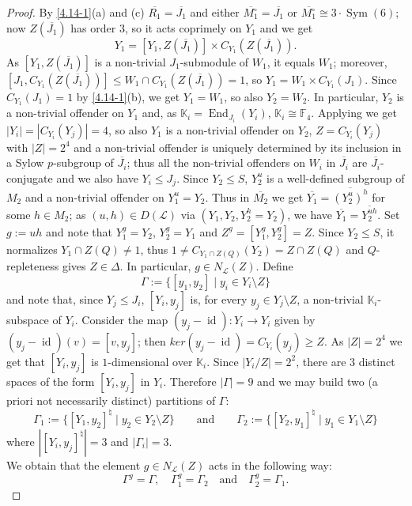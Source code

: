 \documentclass{amsart}
\numberwithin{equation}{section}
\theoremstyle{definition}
\theoremstyle{subresult}
\theoremstyle{caseresult}
\newcommand{\bF}{\mathbb{F}}
\newcommand{\bK}{\mathbb{K}}
\renewcommand{\L}{\mathcal{L}}
\newcommand{\End}{\operatorname{End}}
\newcommand{\id}{\operatorname{id}}
\newcommand{\Sym}{\operatorname{Sym}}
\newcommand{\ov}{\overline}
\newcommand{\fto}{\longrightarrow}
\newcommand{\<}{\langle}
\renewcommand{\>}{\rangle}
\begin{document}
\begin{proof}
	By \eqref{4.14-1}(a) and (c) $\ov{R_1} = \ov{J_1}$ and either $\ov{M_1^\circ} = \ov{J_1}$ or $\ov{M_1^\circ} \cong 3 \cdot \Sym(6)$; now $Z(\ov{J_1})$ has order $3$, so it acts coprimely on $Y_1$ and we get
	\[
	Y_1 = [Y_1,Z(\ov{J_1})] \times C_{Y_1}(Z(\ov{J_1})).
	\]
	As $[Y_1,Z(\ov{J_1})]$ is a non-trivial $J_1$-submodule of $W_1$, it equals $W_1$; moreover, $[J_1, C_{Y_1}(Z(\ov{J_1}))] \le W_1 \cap C_{Y_1}(Z(\ov{J_1})) =1$, so $Y_1 = W_1 \times C_{Y_1}(J_1)$. Since $C_{Y_1}(J_1) = 1$ by \eqref{4.14-1}(b), we get $Y_1 = W_1$, so also $Y_2 =W_2$. In particular, $Y_2$ is a non-trivial offender on $Y_1$ and, as $\bK_i=\End_{J_i}(Y_i)$, $\bK_i \cong \bF_4$. Applying \cite[Theorem C.4(e)]{Meier-Stell-Stroth:2012} we get $|Y_i|=|C_{Y_i}(Y_j)| = 4$, so also $Y_1$ is a non-trivial offender on $Y_2$, $Z=C_{Y_i}(Y_j)$ with $|Z|=2^4$ and a non-trivial offender is uniquely determined by its inclusion in a Sylow $p$-subgroup of $\ov{J_i}$; thus all the non-trivial offenders on $W_i$ in $\ov{J_i}$ are $\ov{J_i}$-conjugate and we also have $Y_i \le J_j$. Since $Y_2 \le S$, $Y_2^u$ is a well-defined subgroup of $M_2$ and a non-trivial offender on $Y_1^u = Y_2$. Thus in $\ov{M_2}$ we get $\ov{Y_1} = \ov{(Y_2^u)^h}$ for some $h \in M_2$; as $(u,h) \in D(\L)$ via $(Y_1, Y_2, Y_2^h=Y_2)$, we have $\ov{Y_1}=\ov{Y_2^{uh}}$. Set $g:=uh$ and note that $Y_1^g = Y_2$, $Y_2^g = Y_1$ and $Z^g=[Y_1^g,Y_2^g] =Z$. Since $Y_2 \le S$, it normalizes $Y_1 \cap Z(Q) \ne 1$, thus $1 \ne C_{Y_1 \cap Z(Q)}(Y_2) = Z \cap Z(Q)$ and $Q$-repleteness gives $Z \in \Delta$. In particular, $g \in N_\L(Z)$. Define
	\[
	\Gamma := \{ [y_1,y_2] \mid y_i \in Y_i \setminus Z \}
	\]
	and note that, since $Y_j \le J_i$, $[Y_i,y_j]$ is, for every $y_j \in Y_j \setminus Z$, a non-trivial $\bK_i$-subspace of $Y_i$. Consider the map $(y_j - \id): Y_i \fto Y_i$ given by $(y_j - \id)(v) = [v,y_j]$; then $ker(y_j - \id) = C_{Y_i}(y_j) \ge Z$. As $|Z|=2^4$ we get that $[Y_i,y_j]$ is $1$-dimensional over $\bK_i$. Since $|Y_i/Z|=2^2$, there are $3$ distinct spaces of the form $[Y_i,y_j]$ in $Y_i$.
	Therefore $|\Gamma|=9$ and we may build two (a priori not necessarily distinct) partitions of $\Gamma$:
	\[
	\Gamma_1:= \{ [Y_1,y_2]^\natural \mid y_2 \in Y_2 \setminus Z \} \qquad \text{and} \qquad 
	\Gamma_2:= \{ [Y_2,y_1]^\natural \mid y_1 \in Y_1 \setminus Z \}
	\]
	where $|[Y_i,y_j]^\natural | = 3$ and $|\Gamma_i|=3$.\\
	We obtain that the element $g \in N_\L(Z)$ acts in the following way:
	\[ \Gamma^g = \Gamma, \quad \Gamma_1^g = \Gamma_2 \quad \text{and} \quad \Gamma_2^g=\Gamma_1.
\]
\end{proof}
\end{document}
